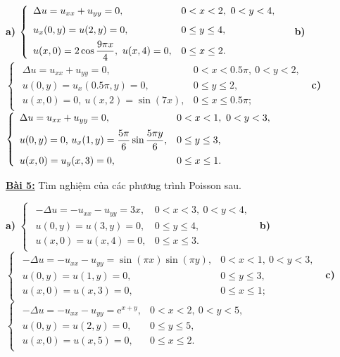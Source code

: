 \documentclass[10pt, a4paper]{article}
\begin{document}
	\begin{flushleft}
		\textbf{a) }$\begin{cases}
			\begin{array}{ll}
				\Delta u=u_{xx}+u_{yy}=0, & 0<x<2,~0<y<4,\\
				\noalign{\vskip5pt}
				u_x(0,y)=u(2,y)=0, & 0\le y\le 4,\\
				\noalign{\vskip4pt}
				u(x,0)=2\cos\dfrac{9\pi x}{4},~u(x,4)=0, & 0\le x\le2.
			\end{array}
		\end{cases}$\vskip7pt
		\textbf{b) }$\begin{cases}
			\begin{array}{ll}
				\Delta u=u_{xx}+u_{yy}=0, & 0<x<0.5\pi,~0<y<2,\\
				u(0,y)=u_x(0.5\pi,y)=0, & 0\le y\le 2,\\
				u(x,0)=0,~u(x,2)=\sin(7x), & 0\le x\le0.5\pi;
			\end{array}
		\end{cases}$\vskip7pt
		\textbf{c) }$\begin{cases}
			\begin{array}{ll}
				\Delta u=u_{xx}+u_{yy}=0, & 0<x<1,~0<y<3,\\
				\noalign{\vskip5pt}
				u(0,y)=0,\,u_x(1,y)=\dfrac{5\pi}6\sin\dfrac{5\pi y}{6}, & 0\le y\le 3,\\
				\noalign{\vskip4pt}
				u(x,0)=u_y(x,3)=0, & 0\le x\le1.
			\end{array}
		\end{cases}$
	\end{flushleft}
	\textbf{\color{red}\underline{Bài 5:}} Tìm nghiệm của các phương trình Poisson sau.
	\begin{flushleft}
		\textbf{a) }$\begin{cases}
			\begin{array}{ll}
				-\Delta u=-u_{xx}-u_{yy}=3x, & 0<x<3,~0<y<4,\\
				u(0,y)=u(3,y)=0, & 0\le y\le4,\\
				u(x,0)=u(x,4)=0, & 0\le x\le3.
			\end{array}
		\end{cases}$\vskip7pt
		\textbf{b) }$\begin{cases}
			\begin{array}{ll}
				-\Delta u=-u_{xx}-u_{yy}=\sin(\pi x)\sin(\pi y), & 0<x<1,~0<y<3,\\
				u(0,y)=u(1,y)=0, & 0\le y\le3,\\
				u(x,0)=u(x,3)=0, & 0\le x\le1;
			\end{array}
		\end{cases}$\vskip7pt
		\textbf{c) }$\begin{cases}
		\begin{array}{ll}
			-\Delta u=-u_{xx}-u_{yy}=\mathrm e^{x+y}, & 0<x<2,~0<y<5,\\
			u(0,y)=u(2,y)=0, & 0\le y\le5,\\
			u(x,0)=u(x,5)=0, & 0\le x\le2.
		\end{array}
		\end{cases}$
	\end{flushleft}
	\newpage
\end{document}
